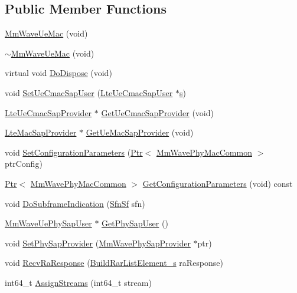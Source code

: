 \subsection*{Public Member Functions}
\begin{DoxyCompactItemize}
\item 
\hyperlink{classns3_1_1MmWaveUeMac_a517f5029102030abf3e3f04ca69abdce}{Mm\+Wave\+Ue\+Mac} (void)
\item 
\hyperlink{classns3_1_1MmWaveUeMac_ad5a78c595be6982a3fb6dd9ffe4ac046}{$\sim$\+Mm\+Wave\+Ue\+Mac} (void)
\item 
virtual void \hyperlink{classns3_1_1MmWaveUeMac_a1c73e9075fef0eb7579b550bbf377863}{Do\+Dispose} (void)
\item 
void \hyperlink{classns3_1_1MmWaveUeMac_a78584441c672c33c8d089aaade37adfa}{Set\+Ue\+Cmac\+Sap\+User} (\hyperlink{classns3_1_1LteUeCmacSapUser}{Lte\+Ue\+Cmac\+Sap\+User} $\ast$\hyperlink{generate__test__data__lte__sinr_8m_ad83eeb3a142285d1243a08c6b7026df8}{s})
\item 
\hyperlink{classns3_1_1LteUeCmacSapProvider}{Lte\+Ue\+Cmac\+Sap\+Provider} $\ast$ \hyperlink{classns3_1_1MmWaveUeMac_aaa1348c29bc2ce64b7f2b6aeec9350d0}{Get\+Ue\+Cmac\+Sap\+Provider} (void)
\item 
\hyperlink{classns3_1_1LteMacSapProvider}{Lte\+Mac\+Sap\+Provider} $\ast$ \hyperlink{classns3_1_1MmWaveUeMac_a5c567f7f58c787564b68f36f665d0731}{Get\+Ue\+Mac\+Sap\+Provider} (void)
\item 
void \hyperlink{classns3_1_1MmWaveUeMac_ab871f70772c63e5bcc921c48615d579a}{Set\+Configuration\+Parameters} (\hyperlink{classns3_1_1Ptr}{Ptr}$<$ \hyperlink{classns3_1_1MmWavePhyMacCommon}{Mm\+Wave\+Phy\+Mac\+Common} $>$ ptr\+Config)
\item 
\hyperlink{classns3_1_1Ptr}{Ptr}$<$ \hyperlink{classns3_1_1MmWavePhyMacCommon}{Mm\+Wave\+Phy\+Mac\+Common} $>$ \hyperlink{classns3_1_1MmWaveUeMac_ae70bbd60fe49e46313b05159875a38db}{Get\+Configuration\+Parameters} (void) const 
\item 
void \hyperlink{classns3_1_1MmWaveUeMac_a905a9781fc56f08e828c47f9407ba65b}{Do\+Subframe\+Indication} (\hyperlink{structns3_1_1SfnSf}{Sfn\+Sf} sfn)
\item 
\hyperlink{classns3_1_1MmWaveUePhySapUser}{Mm\+Wave\+Ue\+Phy\+Sap\+User} $\ast$ \hyperlink{classns3_1_1MmWaveUeMac_ae329cf70af9b3f0ea7a2ff377c5bfd4b}{Get\+Phy\+Sap\+User} ()
\item 
void \hyperlink{classns3_1_1MmWaveUeMac_abf4cb423fc1b2e3fb50cd18c4be4a900}{Set\+Phy\+Sap\+Provider} (\hyperlink{classns3_1_1MmWavePhySapProvider}{Mm\+Wave\+Phy\+Sap\+Provider} $\ast$ptr)
\item 
void \hyperlink{classns3_1_1MmWaveUeMac_a26fb9a92505d966b0cfe47b87cc1cc6e}{Recv\+Ra\+Response} (\hyperlink{structns3_1_1BuildRarListElement__s}{Build\+Rar\+List\+Element\+\_\+s} ra\+Response)
\item 
int64\+\_\+t \hyperlink{classns3_1_1MmWaveUeMac_a7cae3b3ca87732dc5133b8bf452ec902}{Assign\+Streams} (int64\+\_\+t stream)
\end{DoxyCompactItemize}
